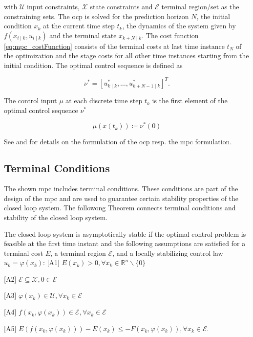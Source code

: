\documentclass[10pt,a4paper]{article}
\begin{document}
with $\mathcal{U}$ input constraints,  $\mathcal{X}$ state constraints and $\mathcal{E}$ terminal region/set as the constraining sets.
The \gls{ocp} is solved for the prediction horizon $N$, the initial condition $x_k$ at the current time step $t_k$, the dynamics
of the system given by $f\left(x_{i \mid k}, u_{i \mid k}\right)$ and the terminal state $x_{k+N \mid k}$. The cost function \eqref{eq:mpc_costFunction}
consists of the terminal costs at last time instance $t_N$ of the optimization and the stage costs for all other time instances starting from
the initial condition. The optimal control sequence is defined as

\begin{equation}
	\nu^* = [u_{k \mid k}^*, \dots , u_{k+N-1\mid k}^*]^T.
\end{equation}

The control input $\mu$ at each discrete time step $t_k$ is the first element of the optimal control sequence $\nu^*$

\begin{equation}
\mu(x(t_k)) \coloneqq \nu^*(0)
\end{equation}

See \cite{nmpcBible} and \cite{RaffAllgoewer} for details on the formulation of the \gls{ocp} resp. the \gls{mpc} formulation.

\subsection{Terminal Conditions}
The shown \gls{mpc} includes terminal conditions. These conditions are part of the design of the \gls{mpc} and are used to
guarantee certain stability properties of the closed loop system. The followong Theorem connects terminal conditions and
stability of the closed loop system. \cite{RaffAllgoewer}

\begin{tcolorbox}[colback=gray!20, colframe=gray!80,title=Theorem 1,arc=0.0mm]
The closed loop system is asymptotically stable if the optimal control problem is feasible at the first time instant and
the following assumptions are satisfied for a terminal cost $E$, a terminal region $\mathcal{E}$, and a locally stabilizing
control law $u_{k}=\varphi\left(x_{k}\right)$:
[A1] $E\left(x_{k}\right)>0, \forall x_{k} \in \mathbb{R}^{n} \backslash\{0\}$

[A2]  $\mathcal{E} \subseteq \mathcal{X}, 0 \in \mathcal{E}$

[A3] $\varphi\left(x_{k}\right) \in \mathcal{U}, \forall x_{k} \in \mathcal{E}$

[A4] $f\left(x_{k}, \varphi\left(x_{k}\right)\right) \in \mathcal{E}, \forall x_{k} \in \mathcal{E}$

[A5] $E\left(f\left(x_{k}, \varphi\left(x_{k}\right)\right)\right)-E\left(x_{k}\right) \leq-F\left(x_{k}, \varphi\left(x_{k}\right)\right), \forall x_{k} \in \mathcal{E}$.
\end{tcolorbox}
\end{document}

